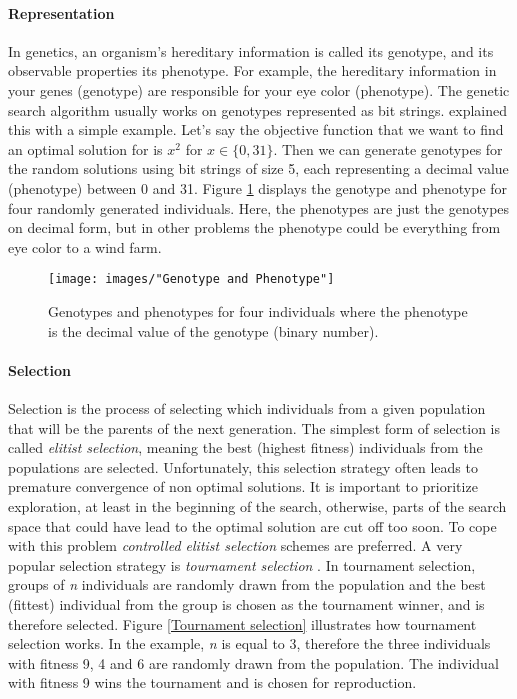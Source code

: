 \paragraph*{Representation}
In genetics, an organism's hereditary information is called its genotype, and its observable properties its phenotype. For example, the hereditary information in your genes (genotype) are responsible for your eye color (phenotype). The genetic search algorithm usually works on genotypes represented as bit strings. \cite{Goldberg} explained this with a simple example. Let's say the objective function that we want to find an optimal solution for is $x^2$ for $x \in \{0, 31\}$. Then we can generate genotypes for the random solutions using bit strings of size 5, each representing a decimal value (phenotype) between 0 and 31. Figure \ref{Representation} displays the genotype and phenotype for four randomly generated individuals. Here, the phenotypes are just the genotypes on decimal form, but in other problems the phenotype could be everything from eye color to a wind farm.


\begin{figure}[h!]
\begin{center}
\texttt{[image: images/"Genotype and Phenotype"]}
\caption{Genotypes and phenotypes for four individuals where the phenotype is the decimal value of the genotype (binary number).}
\label{Representation}
\end{center}
\end{figure}


\paragraph*{Selection}
Selection is the process of selecting which individuals from a given population that will be the parents of the next generation. The simplest form of selection is called \textit{elitist selection}, meaning the best (highest fitness) individuals from the populations are selected. Unfortunately, this selection strategy often leads to premature convergence of non optimal solutions. It is important to prioritize exploration, at least in the beginning of the search, otherwise, parts of the search space that could have lead to the optimal solution are cut off too soon. To cope with this problem \textit{controlled elitist selection} schemes are preferred. A very popular selection strategy is \textit{tournament selection} \citep{Razali}. In tournament selection, groups of \textit{n} individuals are randomly drawn from the population and the best (fittest) individual from the group is chosen as the tournament winner, and is therefore selected. Figure \ref{Tournament selection} illustrates how tournament selection works. In the example, \textit{n} is equal to 3, therefore the three individuals with fitness 9, 4 and 6 are randomly drawn from the population. The individual with fitness 9 wins the tournament and is chosen for reproduction.\\


